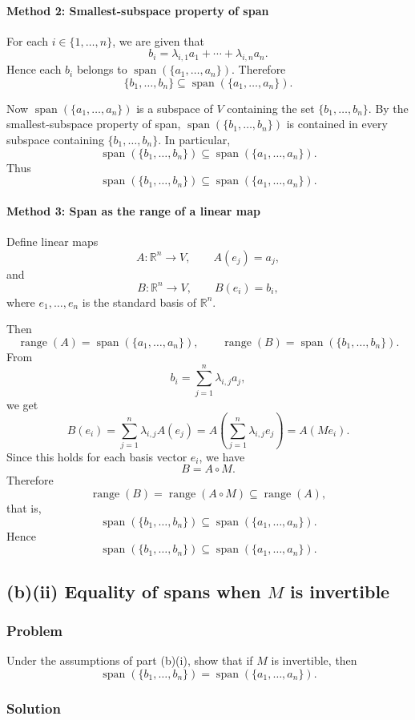 \documentclass[12pt]{article}
\newcommand{\R}{\mathbb{R}}
\DeclareMathOperator{\Range}{range}
\newcommand{\Span}{\operatorname{span}}
\begin{document}
\paragraph{Method 2: Smallest-subspace property of span}
For each \(i\in\{1,\ldots,n\}\), we are given that
\[
b_i=\lambda_{i,1}a_1+\cdots+\lambda_{i,n}a_n.
\]
Hence each \(b_i\) belongs to \(\Span(\{a_1,\ldots,a_n\})\). Therefore
\[
\{b_1,\ldots,b_n\}\subseteq \Span(\{a_1,\ldots,a_n\}).
\]

Now \(\Span(\{a_1,\ldots,a_n\})\) is a subspace of \(V\) containing the set \(\{b_1,\ldots,b_n\}\). By the smallest-subspace property of span, \(\Span(\{b_1,\ldots,b_n\})\) is contained in every subspace containing \(\{b_1,\ldots,b_n\}\). In particular,
\[
\Span(\{b_1,\ldots,b_n\})\subseteq \Span(\{a_1,\ldots,a_n\}).
\]
Thus
\[
\boxed{\Span(\{b_1,\ldots,b_n\})\subseteq \Span(\{a_1,\ldots,a_n\}).}
\]

\paragraph{Method 3: Span as the range of a linear map}
Define linear maps
\[
A:\R^n\to V,\qquad A(e_j)=a_j,
\]
and
\[
B:\R^n\to V,\qquad B(e_i)=b_i,
\]
where \(e_1,\ldots,e_n\) is the standard basis of \(\R^n\).

Then
\[
\Range(A)=\Span(\{a_1,\ldots,a_n\}),\qquad
\Range(B)=\Span(\{b_1,\ldots,b_n\}).
\]
From
\[
b_i=\sum_{j=1}^n\lambda_{i,j}a_j,
\]
we get
\[
B(e_i)=\sum_{j=1}^n\lambda_{i,j}A(e_j)=A\!\left(\sum_{j=1}^n\lambda_{i,j}e_j\right)=A(Me_i).
\]
Since this holds for each basis vector \(e_i\), we have
\[
B=A\circ M.
\]
Therefore
\[
\Range(B)=\Range(A\circ M)\subseteq \Range(A),
\]
that is,
\[
\Span(\{b_1,\ldots,b_n\})\subseteq \Span(\{a_1,\ldots,a_n\}).
\]
Hence
\[
\boxed{\Span(\{b_1,\ldots,b_n\})\subseteq \Span(\{a_1,\ldots,a_n\}).}
\]

\bigskip

\newpage
\subsection{(b)(ii) Equality of spans when \(M\) is invertible}
\subsubsection{Problem}
Under the assumptions of part (b)(i), show that if \(M\) is invertible, then
\[
\Span(\{b_1,\ldots,b_n\})=\Span(\{a_1,\ldots,a_n\}).
\]

\subsubsection{Solution}
\end{document}
